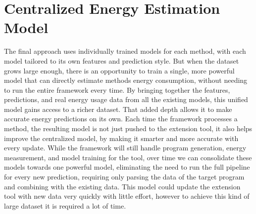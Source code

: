 \section{Centralized Energy Estimation Model} \label{sec:future_work_centralized_energy_estimation_model}

The final approach uses individually trained models for each method, with each model tailored to its own features and prediction style. But when the dataset grows large enough, there is an opportunity to train a single, more powerful model that can directly estimate methods energy consumption, without needing to run the entire framework every time.
By bringing together the features, predictions, and real energy usage data from all the existing models, this unified model gains access to a richer dataset. That added depth allows it to make accurate energy predictions on its own. Each time the framework processes a method, the resulting model is not just pushed to the extension tool, it also helps improve the centralized model, by making it smarter and more accurate with every update.
While the framework will still handle program generation, energy measurement, and model training for the tool, over time we can consolidate these models towards one powerful model, eliminating the need to run the full pipeline for every new prediction, requiring only parsing the data of the target program and combining with the existing data.
This model could update the extension tool with new data very quickly with little effort, however to achieve this kind of large dataset it is required a lot of time.
















